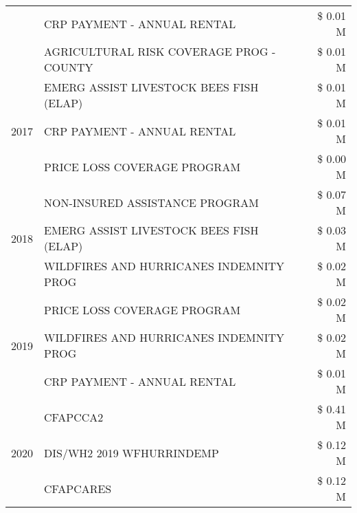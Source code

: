\begin{tabular}{llr}
 & CRP PAYMENT - ANNUAL RENTAL                   & \$ 0.01 M \\
 & AGRICULTURAL RISK COVERAGE PROG - COUNTY      & \$ 0.01 M \\
\cline{1-3}
\multirow[t]{3}{*}{2017} & EMERG ASSIST LIVESTOCK BEES FISH (ELAP) & \$ 0.01 M \\
 & CRP PAYMENT - ANNUAL RENTAL & \$ 0.01 M \\
 & PRICE LOSS COVERAGE PROGRAM & \$ 0.00 M \\
\cline{1-3}
\multirow[t]{3}{*}{2018} & NON-INSURED ASSISTANCE PROGRAM & \$ 0.07 M \\
 & EMERG ASSIST LIVESTOCK BEES FISH (ELAP) & \$ 0.03 M \\
 & WILDFIRES AND HURRICANES INDEMNITY PROG & \$ 0.02 M \\
\cline{1-3}
\multirow[t]{3}{*}{2019} & PRICE LOSS COVERAGE PROGRAM & \$ 0.02 M \\
 & WILDFIRES AND HURRICANES INDEMNITY PROG & \$ 0.02 M \\
 & CRP PAYMENT - ANNUAL RENTAL & \$ 0.01 M \\
\cline{1-3}
\multirow[t]{3}{*}{2020} & CFAPCCA2 & \$ 0.41 M \\
 & DIS/WH2 2019 WFHURRINDEMP & \$ 0.12 M \\
 & CFAPCARES & \$ 0.12 M \\
\cline{1-3}
\bottomrule
\end{tabular}
